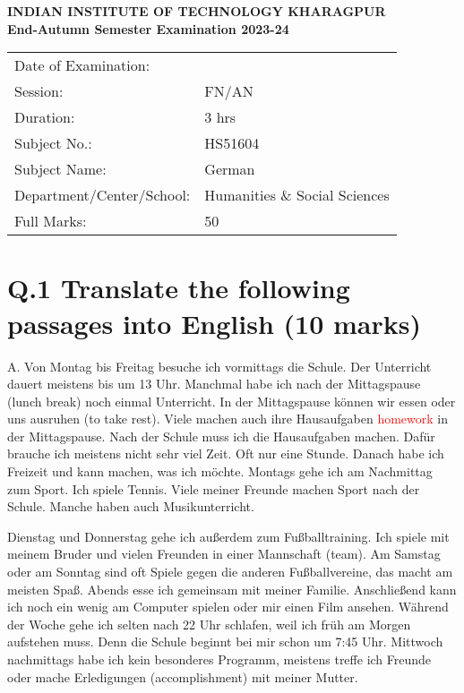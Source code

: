 \documentclass[a4paper,12pt]{article}
\begin{document}
\begin{center}
    \textbf{INDIAN INSTITUTE OF TECHNOLOGY KHARAGPUR}\\
    \textbf{End-Autumn Semester Examination 2023-24}\\
    \vspace{0.5cm}
    \begin{tabular}{l l}
        Date of Examination: & \hspace{2cm} \\
        Session: & FN/AN \\
        Duration: & 3 hrs \\
        Subject No.: & HS51604 \\
        Subject Name: & German \\
        Department/Center/School: & Humanities \& Social Sciences \\
        Full Marks: & 50 \\
    \end{tabular}
\end{center}

\vspace{1cm}

\section*{Q.1 Translate the following passages into English (10 marks)}

A. Von Montag bis Freitag besuche ich vormittags die Schule. Der Unterricht dauert meistens bis um 13 Uhr. Manchmal habe ich nach der Mittagspause (lunch break) noch einmal Unterricht. In der Mittagspause können wir essen oder uns ausruhen (to take rest). Viele machen auch ihre Hausaufgaben \textcolor{red}{homework} in der Mittagspause. Nach der Schule muss ich die Hausaufgaben machen. Dafür brauche ich meistens nicht sehr viel Zeit. Oft nur eine Stunde. Danach habe ich Freizeit und kann machen, was ich möchte. Montags gehe ich am Nachmittag zum Sport. Ich spiele Tennis. Viele meiner Freunde machen Sport nach der Schule. Manche haben auch Musikunterricht.

Dienstag und Donnerstag gehe ich außerdem zum Fußballtraining. Ich spiele mit meinem Bruder und vielen Freunden in einer Mannschaft (team). Am Samstag oder am Sonntag sind oft Spiele gegen die anderen Fußballvereine, das macht am meisten Spaß. Abends esse ich gemeinsam mit meiner Familie. Anschließend kann ich noch ein wenig am Computer spielen oder mir einen Film ansehen. Während der Woche gehe ich selten nach 22 Uhr schlafen, weil ich früh am Morgen aufstehen muss. Denn die Schule beginnt bei mir schon um 7:45 Uhr. Mittwoch nachmittags habe ich kein besonderes Programm, meistens treffe ich Freunde oder mache Erledigungen (accomplishment) mit meiner Mutter.
\end{document}
